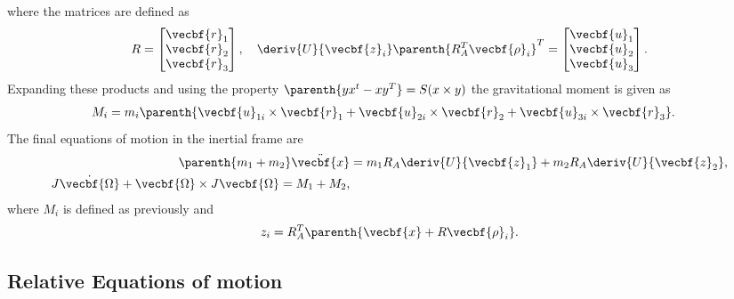 \documentclass[11pt, reqno]{article}    %
\begin{document}
where the matrices are defined as
\begin{align*}
    R = \begin{bmatrix} \vecbf{r}_1 \\ \vecbf{r}_2 \\ \vecbf{r}_3\end{bmatrix} ,\quad
    \deriv{U}{\vecbf{z}_i} \parenth{R_A^T \vecbf{\rho}_i}^T = \begin{bmatrix} \vecbf{u}_1 \\ \vecbf{u}_2 \\ \vecbf{u}_3\end{bmatrix}.
\end{align*}
Expanding these products and using the property \(  \parenth{ y x^t - x y^T} = S(x \times y) \) the gravitational moment is given as
\begin{align}
    M_i &= m_i \parenth{ \vecbf{u}_{1i} \times \vecbf{r}_1 + \vecbf{u}_{2i} \times \vecbf{r}_2 + \vecbf{u}_{3i} \times \vecbf{r}_3} .
\end{align}
The final equations of motion in the inertial frame are 
\begin{align}
    \parenth{m_1 + m_2 } \ddot{\vecbf{x}} &= m_1 R_A \deriv{U}{\vecbf{z}_1} + m_2 R_A \deriv{U}{\vecbf{z}_2} ,\\ 
    J \dot{\vecbf{\Omega}} + \vecbf{\Omega} \times J \vecbf{\Omega } = M_1 + M_2 ,
\end{align}
where \( M_i \) is defined as previously and 
\begin{align*}
    z_i = R_A^T \parenth{\vecbf{x} + R \vecbf{\rho}_i}.
\end{align*}

\subsection{Relative Equations of motion}\label{sec:relative_eoms}
\end{document}
